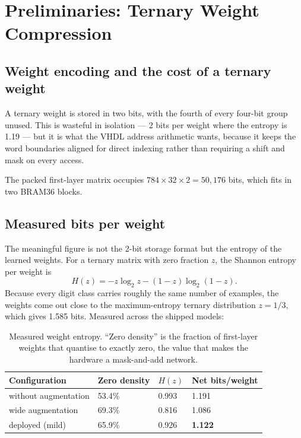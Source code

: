 \documentclass[11pt,a4paper]{article}
\begin{document}
\section{Preliminaries: Ternary Weight Compression}
\label{sec:ternary}

\subsection{Weight encoding and the cost of a ternary weight}

A ternary weight is stored in two bits, with the fourth of every four-bit group
unused. This is wasteful in isolation --- 2 bits per weight where the entropy is
1.19 --- but it is what the VHDL address arithmetic wants, because it keeps the
word boundaries aligned for direct indexing rather than requiring a shift and
mask on every access.

The packed first-layer matrix occupies $784 \times 32 \times 2 = 50{,}176$
bits, which fits in two BRAM36 blocks.

\subsection{Measured bits per weight}

The meaningful figure is not the 2-bit storage format but the entropy of the
learned weights. For a ternary matrix with zero fraction $z$, the Shannon
entropy per weight is
\[
H(z) = -z\log_2 z - (1-z)\log_2(1-z).
\]
Because every digit class carries roughly the same number of examples, the
weights come out close to the maximum-entropy ternary distribution $z = 1/3$,
which gives 1.585 bits. Measured across the shipped models:

\begin{table}[H]
\centering
\small
\caption{Measured weight entropy. ``Zero density'' is the fraction of first-layer
  weights that quantise to exactly zero, the value that makes the hardware a
  mask-and-add network.}
\begin{tabularx}{\linewidth}{@{}lY Y Y@{}}
\toprule
\textbf{Configuration} & \textbf{Zero density} & \textbf{$H(z)$} & \textbf{Net bits/weight} \\
\midrule
without augmentation & 53.4\% & 0.993 & 1.191 \\
wide augmentation   & 69.3\% & 0.816 & 1.086 \\
deployed (mild)     & 65.9\% & 0.926 & \textbf{1.122} \\
\bottomrule
\end{tabularx}
\end{table}
\end{document}
